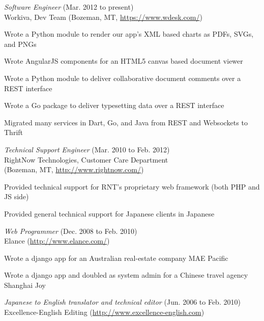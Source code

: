 \documentclass[10pt, a4paper]{article}
\begin{document}
\begin{itemize*}
  \item \emph{Software Engineer} (Mar. 2012 to present)\\
    Workiva, Dev Team (Bozeman, MT, \url{https://www.wdesk.com/})
    \begin{itemize*}
      \item Wrote a Python module to render our app's XML based charts as PDFs, SVGs, and PNGs
      \item Wrote AngularJS components for an HTML5 canvas based document viewer
      \item Wrote a Python module to deliver collaborative document comments over a REST interface
      \item Wrote a Go package to deliver typesetting data over a REST interface
      \item Migrated many services in Dart, Go, and Java from REST and Websockets to Thrift
    \end{itemize*}
  \item \emph{Technical Support Engineer} (Mar. 2010 to Feb. 2012)\\
    RightNow Technologies, Customer Care Department\\
    (Bozeman, MT, \url{http://www.rightnow.com/})
    \begin{itemize*}
      \item Provided technical support for RNT's proprietary web framework (both PHP and JS side)
      \item Provided general technical support for Japanese clients in Japanese
    \end{itemize*}
  \item \emph{Web Programmer} (Dec. 2008 to Feb. 2010)\\
    Elance (\url{http://www.elance.com/})
    \begin{itemize*}
      \item Wrote a django app for an Australian real-estate company MAE Pacific
      \item Wrote a django app and doubled as system admin for a Chinese travel agency Shanghai Joy
    \end{itemize*}
  \item \emph{Japanese to English translator and technical editor} (Jun. 2006 to Feb. 2010)\\
    Excellence-English Editing (\url{http://www.excellence-english.com})
\end{itemize*}
\end{document}

